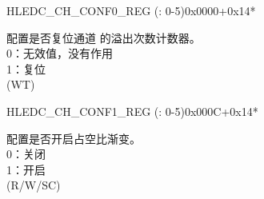 \addtocounter{Regfloat}{-1}
\begin{register}{H}{LEDC\_CH\_CONF0\_REG (: 0-5)}{0x0000+0x14*}
\begin{regdesc}\begin{reglist}
\item [接上页...]

\label{fielddesc:LEDCOVFCNTRESETCHN}\item [LEDC\_OVF\_CNT\_RESET\_CH\regindex{n}] 配置是否复位通道  的溢出次数计数器。\\
0：无效值，没有作用\\
1：复位\\
(WT)
\end{reglist}\end{regdesc}
\end{register}


\begin{register}{H}{LEDC\_CH\_CONF1\_REG (: 0-5)}{0x000C+0x14*}\label{regdesc:LEDCCHNCONF1REG}
%
%
\regnewline%
\begin{regdesc}\begin{reglist}
\label{fielddesc:LEDCDUTYSTARTCHN}\item [LEDC\_DUTY\_START\_CH\regindex{n}] 配置是否开启占空比渐变。\\
0：关闭\\
1：开启\\ (R/W/SC)
\end{reglist}\end{regdesc}
\end{register}


